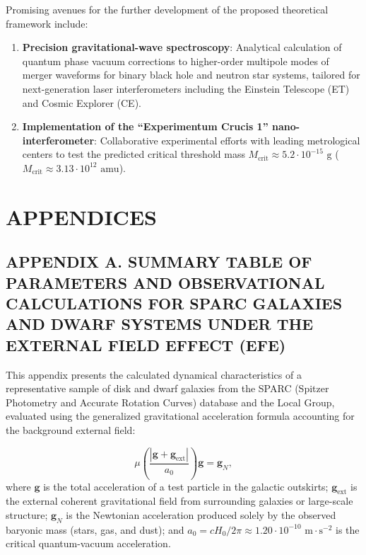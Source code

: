 Promising avenues for the further development of the proposed theoretical framework include:
\begin{enumerate}
\item \textbf{Precision gravitational-wave spectroscopy}: Analytical calculation of quantum phase vacuum corrections to higher-order multipole modes of merger waveforms for binary black hole and neutron star systems, tailored for next-generation laser interferometers including the Einstein Telescope (ET) and Cosmic Explorer (CE).

\item \textbf{Implementation of the ``Experimentum Crucis 1'' nano-interferometer}: Collaborative experimental efforts with leading metrological centers to test the predicted critical threshold mass $M_{\text{crit}} \approx 5.2 \cdot 10^{-15}\text{ g}$ ($M_{\text{crit}} \approx 3.13 \cdot 10^{12}\text{ amu}$).
\end{enumerate}

\clearpage
\appendix

\section*{APPENDICES}

\subsection*{APPENDIX A. SUMMARY TABLE OF PARAMETERS AND OBSERVATIONAL CALCULATIONS FOR SPARC GALAXIES AND DWARF SYSTEMS UNDER THE EXTERNAL FIELD EFFECT (EFE)}

This appendix presents the calculated dynamical characteristics of a representative sample of disk and dwarf galaxies from the SPARC (Spitzer Photometry and Accurate Rotation Curves) database and the Local Group, evaluated using the generalized gravitational acceleration formula accounting for the background external field:

\begin{equation}\label{eq:A.1}\tag{A.1}
\mu\left(\frac{|\mathbf{g} + \mathbf{g}_{\text{ext}}|}{a_0}\right) \mathbf{g} = \mathbf{g}_N,
\end{equation}
where $\mathbf{g}$ is the total acceleration of a test particle in the galactic outskirts; $\mathbf{g}_{\text{ext}}$ is the external coherent gravitational field from surrounding galaxies or large-scale structure; $\mathbf{g}_N$ is the Newtonian acceleration produced solely by the observed baryonic mass (stars, gas, and dust); and $a_0 = c H_0 / 2\pi \approx 1.20 \cdot 10^{-10}\text{ m}\cdot\text{s}^{-2}$ is the critical quantum-vacuum acceleration.

